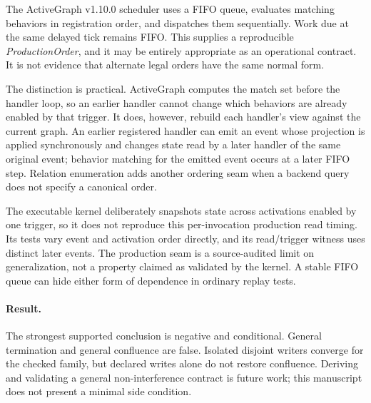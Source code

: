 The ActiveGraph v1.10.0 scheduler uses a FIFO queue, evaluates matching
behaviors in registration order, and dispatches them sequentially.  Work due at
the same delayed tick remains FIFO.  This supplies a reproducible
\emph{ProductionOrder}, and it may be entirely appropriate as an operational
contract.  It is not evidence that alternate legal orders have the same normal
form.

The distinction is practical.  ActiveGraph computes the match set before the
handler loop, so an earlier handler cannot change which behaviors are already
enabled by that trigger.  It does, however, rebuild each handler's view against
the current graph.  An earlier registered handler can emit an event whose
projection is applied synchronously and changes state read by a later handler
of the same original event; behavior matching for the emitted event occurs at a
later FIFO step.  Relation enumeration adds another ordering seam when a
backend query does not specify a canonical order.

The executable kernel deliberately snapshots state across activations enabled
by one trigger, so it does not reproduce this per-invocation production read
timing.  Its tests vary event and activation order directly, and its
read/trigger witness uses distinct later events.  The production seam is a
source-audited limit on generalization, not a property claimed as validated by
the kernel.  A stable FIFO queue can hide either form of dependence in ordinary
replay tests.

\paragraph{Result.}
The strongest supported conclusion is negative and conditional.  General
termination and general confluence are false.  Isolated disjoint writers
converge for the checked family, but declared writes alone do not restore
confluence.  Deriving and validating a general non-interference contract is
future work; this manuscript does not present a minimal side condition.
